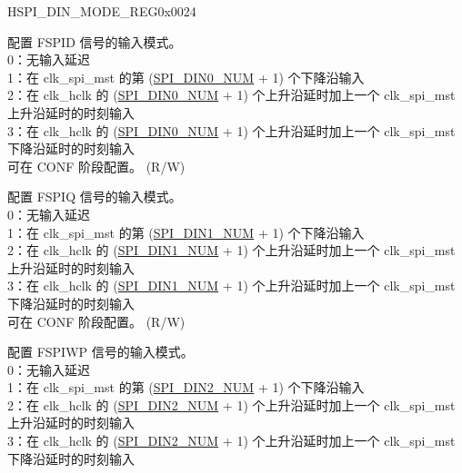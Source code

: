 \begin{register}{H}{SPI\_DIN\_MODE\_REG}{0x0024}\label{regdesc:SPIDINMODEREG}
%
%
%
%
%
%
%
\regnewline%
\begin{regdesc}\begin{reglist}
\label{fielddesc:SPIDIN0MODE}\item [SPI\_DIN0\_MODE] 配置 FSPID 信号的输入模式。\\
0：无输入延迟 \\
1：在 clk\_spi\_mst 的第 (\hyperref[fielddesc:SPIDIN0NUM]{SPI\_DIN0\_NUM} + 1) 个下降沿输入 \\
2：在 clk\_hclk 的 (\hyperref[fielddesc:SPIDIN0NUM]{SPI\_DIN0\_NUM} + 1) 个上升沿延时加上一个 clk\_spi\_mst 上升沿延时的时刻输入 \\
3：在 clk\_hclk 的 (\hyperref[fielddesc:SPIDIN0NUM]{SPI\_DIN0\_NUM} + 1) 个上升沿延时加上一个 clk\_spi\_mst 下降沿延时的时刻输入 \\
可在 CONF 阶段配置。 (R/W)
\label{fielddesc:SPIDIN1MODE}\item [SPI\_DIN1\_MODE] 配置 FSPIQ 信号的输入模式。 \\
0：无输入延迟 \\
1：在 clk\_spi\_mst 的第 (\hyperref[fielddesc:SPIDIN1NUM]{SPI\_DIN1\_NUM} + 1) 个下降沿输入 \\
2：在 clk\_hclk 的 (\hyperref[fielddesc:SPIDIN1NUM]{SPI\_DIN1\_NUM} + 1) 个上升沿延时加上一个 clk\_spi\_mst 上升沿延时的时刻输入 \\
3：在 clk\_hclk 的 (\hyperref[fielddesc:SPIDIN1NUM]{SPI\_DIN1\_NUM} + 1) 个上升沿延时加上一个 clk\_spi\_mst 下降沿延时的时刻输入 \\
可在 CONF 阶段配置。 (R/W)
\label{fielddesc:SPIDIN2MODE}\item [SPI\_DIN2\_MODE] 配置 FSPIWP 信号的输入模式。\\
0：无输入延迟 \\
1：在 clk\_spi\_mst 的第 (\hyperref[fielddesc:SPIDIN2NUM]{SPI\_DIN2\_NUM} + 1) 个下降沿输入 \\
2：在 clk\_hclk 的 (\hyperref[fielddesc:SPIDIN2NUM]{SPI\_DIN2\_NUM} + 1) 个上升沿延时加上一个 clk\_spi\_mst 上升沿延时的时刻输入 \\
3：在 clk\_hclk 的 (\hyperref[fielddesc:SPIDIN2NUM]{SPI\_DIN2\_NUM} + 1) 个上升沿延时加上一个 clk\_spi\_mst 下降沿延时的时刻输入 \\

\end{reglist}
\end{regdesc}
\end{register}
